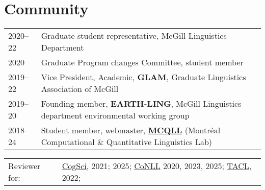 \documentclass[11pt,a4paper]{article}
\begin{document}
  \section{Community}
  \begin{longtable}{p{1.7cm}|p{15cm}}
    \textsc{2020--22}
    &%
    Graduate student representative, McGill Linguistics Department\\
    \textsc{2020}
    &%
    Graduate Program changes Committee, student member\\
    \textsc{2019--22}
    &%
    Vice President, Academic, \textbf{GLAM}, Graduate Linguistics Association of
    McGill\\
    \textsc{2019--20}&%
    Founding member, \textbf{EARTH-LING}, McGill Linguistics department
    environmental working group\\
    \textsc{2018--24}
    &%
    Student member, webmaster, \href{http://mcqll.org}{\textbf{MCQLL}} (Montréal Computational \& Quantitative
    Linguistics Lab)\\
  \end{longtable}
  \begin{longtable}[l]{ll}
    Reviewer for:
    &%
    \href{https://cognitivesciencesociety.org/}{CogSci}, 2021; 2025;
    \href{https://www.conll.org/}{CoNLL} 2020, 2023, 2025;
    \href{https://transacl.org/}{TACL}, 2022;
  \end{longtable}

\end{document}
